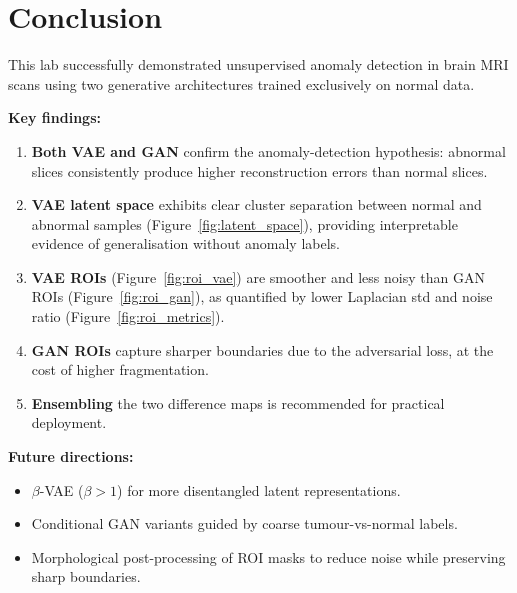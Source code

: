 \documentclass[12pt,a4paper]{article}
\begin{document}
\section{Conclusion}
\label{sec:conclusion}

This lab successfully demonstrated unsupervised anomaly detection in brain MRI scans using two
generative architectures trained exclusively on normal data.

\medskip
\noindent\textbf{Key findings:}

\begin{enumerate}[leftmargin=1.6cm]
    \item \textbf{Both VAE and GAN} confirm the anomaly-detection hypothesis: abnormal slices
          consistently produce higher reconstruction errors than normal slices.

    \item \textbf{VAE latent space} exhibits clear cluster separation between normal and
          abnormal samples (Figure~\ref{fig:latent_space}), providing interpretable evidence of
          generalisation without anomaly labels.

    \item \textbf{VAE ROIs} (Figure~\ref{fig:roi_vae}) are smoother and less noisy than GAN
          ROIs (Figure~\ref{fig:roi_gan}), as quantified by lower Laplacian std and noise ratio
          (Figure~\ref{fig:roi_metrics}).

    \item \textbf{GAN ROIs} capture sharper boundaries due to the adversarial loss, at the
          cost of higher fragmentation.

    \item \textbf{Ensembling} the two difference maps is recommended for practical deployment.
\end{enumerate}

\medskip
\noindent\textbf{Future directions:}
\begin{itemize}
    \item $\beta$-VAE ($\beta>1$) for more disentangled latent representations.
    \item Conditional GAN variants guided by coarse tumour-vs-normal labels.
    \item Morphological post-processing of ROI masks to reduce noise while preserving
          sharp boundaries.
\end{itemize}
\end{document}
